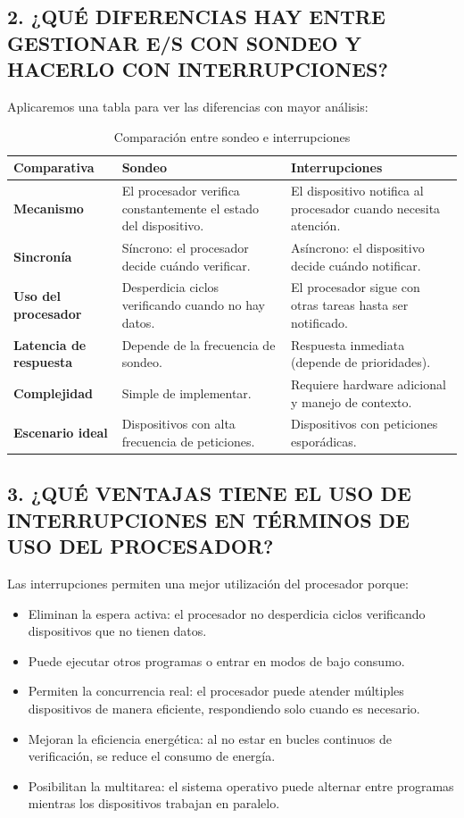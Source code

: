 \documentclass[12pt]{article}
\begin{document}
\subsection*{2. ¿QUÉ DIFERENCIAS HAY ENTRE GESTIONAR E/S CON SONDEO Y HACERLO CON INTERRUPCIONES?}

Aplicaremos una tabla para ver las diferencias con mayor análisis:

\begin{table}[h]
\centering
\begin{tabular}{p{3.5cm}p{5cm}p{5cm}}
\toprule
\textbf{Comparativa} & \textbf{Sondeo} & \textbf{Interrupciones} \\
\midrule
\textbf{Mecanismo} & El procesador verifica constantemente el estado del dispositivo. & El dispositivo notifica al procesador cuando necesita atención. \\
\midrule
\textbf{Sincronía} & Síncrono: el procesador decide cuándo verificar. & Asíncrono: el dispositivo decide cuándo notificar. \\
\midrule
\textbf{Uso del procesador} & Desperdicia ciclos verificando cuando no hay datos. & El procesador sigue con otras tareas hasta ser notificado. \\
\midrule
\textbf{Latencia de respuesta} & Depende de la frecuencia de sondeo. & Respuesta inmediata (depende de prioridades). \\
\midrule
\textbf{Complejidad} & Simple de implementar. & Requiere hardware adicional y manejo de contexto. \\
\midrule
\textbf{Escenario ideal} & Dispositivos con alta frecuencia de peticiones. & Dispositivos con peticiones esporádicas. \\
\bottomrule
\end{tabular}
\caption{Comparación entre sondeo e interrupciones}
\label{tab:sondeo-vs-interrupciones}
\end{table}

\subsection*{3. ¿QUÉ VENTAJAS TIENE EL USO DE INTERRUPCIONES EN TÉRMINOS DE USO DEL PROCESADOR?}

Las interrupciones permiten una mejor utilización del procesador porque:
\begin{itemize}
    \item Eliminan la espera activa: el procesador no desperdicia ciclos verificando dispositivos que no tienen datos.
    \item Puede ejecutar otros programas o entrar en modos de bajo consumo.
    \item Permiten la concurrencia real: el procesador puede atender múltiples dispositivos de manera eficiente, respondiendo solo cuando es necesario.
    \item Mejoran la eficiencia energética: al no estar en bucles continuos de verificación, se reduce el consumo de energía.
    \item Posibilitan la multitarea: el sistema operativo puede alternar entre programas mientras los dispositivos trabajan en paralelo.
\end{itemize}
\end{document}
